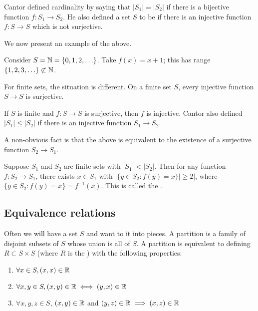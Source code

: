 \documentclass[12pt]{scrartcl}
\begin{document}
\begin{remark}
    Cantor defined cardinality by saying that $|S_1| = |S_2|$ if there is a bijective function $f : S_1 \to S_2$. He also defined a set $S$ to be  if there is an injective function $f : S \to S$ which is not surjective.
\end{remark}

We now present an example of the above.

\begin{example}
    Consider $S = \mathbb N = \{0, 1, 2, \ldots\}$. Take $f(x) = x+1$; this has range $\{1, 2, 3, \ldots\} \not\subset \mathbb N$.
\end{example}

For finite sets, the situation is different. On a  finite set $S$, every injective function $S \to S$ is surjective.

\begin{fact}
    If $S$ is finite and $f : S \to S$ is surjective, then $f$ is injective. Cantor also defined $|S_1| \leq |S_2|$ if there is an injective function $S_1 \to S_2$. 
\end{fact}

A non-obvious fact is that the above is equivalent to the existence of a surjective function $S_2 \to S_1$.

\begin{theorem}
    Suppose $S_1$ and $S_2$ are finite sets with $|S_1| < |S_2|$. Then for any function $f: S_2 \to S_1$, there exists $x \in S_1$ with $|\{y \in S_2 : f(y) = x\}| \geq 2|$, where $\{y \in S_2 : f(y) = x\} = f^{-1}(x)$. This is called the .
\end{theorem}

\subsection{Equivalence relations}

Often we will have a set $S$ and want to  it into pieces. A partition is a family of disjoint subsets of $S$ whose union is all of $S$. A partition is equivalent to defining $R \subset S \times S$ (where $R$ is the ) with the following properties:
    \begin{enumerate}
        \item $\forall x \in S, (x, x) \in \mathbb R$
        \item $\forall x, y \in S, (x, y) \in \mathbb R \iff (y, x) \in \mathbb R$
        \item $\forall x, y, z \in S$, $(x, y) \in \mathbb R$ and $(y, z) \in \mathbb R \implies (x, z) \in \mathbb R$
    \end{enumerate}
\end{document}

